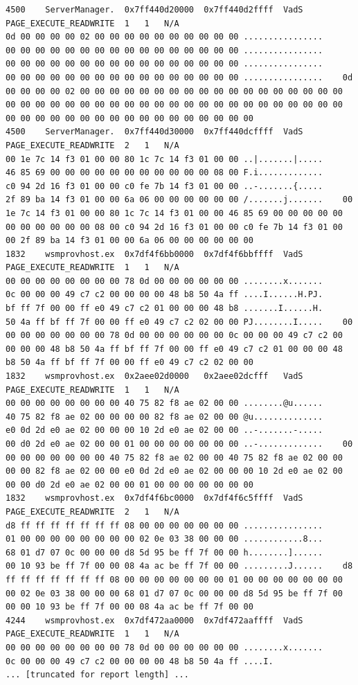 \documentclass[11pt,letterpaper]{article}
\begin{document}
\begin{lstlisting}
4500	ServerManager.	0x7ff440d20000	0x7ff440d2ffff	VadS	PAGE_EXECUTE_READWRITE	1	1	N/A	
0d 00 00 00 00 02 00 00 00 00 00 00 00 00 00 00 ................
00 00 00 00 00 00 00 00 00 00 00 00 00 00 00 00 ................
00 00 00 00 00 00 00 00 00 00 00 00 00 00 00 00 ................
00 00 00 00 00 00 00 00 00 00 00 00 00 00 00 00 ................	0d 00 00 00 00 02 00 00 00 00 00 00 00 00 00 00 00 00 00 00 00 00 00 00 00 00 00 00 00 00 00 00 00 00 00 00 00 00 00 00 00 00 00 00 00 00 00 00 00 00 00 00 00 00 00 00 00 00 00 00 00 00 00 00
4500	ServerManager.	0x7ff440d30000	0x7ff440dcffff	VadS	PAGE_EXECUTE_READWRITE	2	1	N/A	
00 1e 7c 14 f3 01 00 00 80 1c 7c 14 f3 01 00 00 ..|.......|.....
46 85 69 00 00 00 00 00 00 00 00 00 00 00 08 00 F.i.............
c0 94 2d 16 f3 01 00 00 c0 fe 7b 14 f3 01 00 00 ..-.......{.....
2f 89 ba 14 f3 01 00 00 6a 06 00 00 00 00 00 00 /.......j.......	00 1e 7c 14 f3 01 00 00 80 1c 7c 14 f3 01 00 00 46 85 69 00 00 00 00 00 00 00 00 00 00 00 08 00 c0 94 2d 16 f3 01 00 00 c0 fe 7b 14 f3 01 00 00 2f 89 ba 14 f3 01 00 00 6a 06 00 00 00 00 00 00
1832	wsmprovhost.ex	0x7df4f6bb0000	0x7df4f6bbffff	VadS	PAGE_EXECUTE_READWRITE	1	1	N/A	
00 00 00 00 00 00 00 00 78 0d 00 00 00 00 00 00 ........x.......
0c 00 00 00 49 c7 c2 00 00 00 00 48 b8 50 4a ff ....I......H.PJ.
bf ff 7f 00 00 ff e0 49 c7 c2 01 00 00 00 48 b8 .......I......H.
50 4a ff bf ff 7f 00 00 ff e0 49 c7 c2 02 00 00 PJ........I.....	00 00 00 00 00 00 00 00 78 0d 00 00 00 00 00 00 0c 00 00 00 49 c7 c2 00 00 00 00 48 b8 50 4a ff bf ff 7f 00 00 ff e0 49 c7 c2 01 00 00 00 48 b8 50 4a ff bf ff 7f 00 00 ff e0 49 c7 c2 02 00 00
1832	wsmprovhost.ex	0x2aee02d0000	0x2aee02dcfff	VadS	PAGE_EXECUTE_READWRITE	1	1	N/A	
00 00 00 00 00 00 00 00 40 75 82 f8 ae 02 00 00 ........@u......
40 75 82 f8 ae 02 00 00 00 00 82 f8 ae 02 00 00 @u..............
e0 0d 2d e0 ae 02 00 00 00 10 2d e0 ae 02 00 00 ..-.......-.....
00 d0 2d e0 ae 02 00 00 01 00 00 00 00 00 00 00 ..-.............	00 00 00 00 00 00 00 00 40 75 82 f8 ae 02 00 00 40 75 82 f8 ae 02 00 00 00 00 82 f8 ae 02 00 00 e0 0d 2d e0 ae 02 00 00 00 10 2d e0 ae 02 00 00 00 d0 2d e0 ae 02 00 00 01 00 00 00 00 00 00 00
1832	wsmprovhost.ex	0x7df4f6bc0000	0x7df4f6c5ffff	VadS	PAGE_EXECUTE_READWRITE	2	1	N/A	
d8 ff ff ff ff ff ff ff 08 00 00 00 00 00 00 00 ................
01 00 00 00 00 00 00 00 00 02 0e 03 38 00 00 00 ............8...
68 01 d7 07 0c 00 00 00 d8 5d 95 be ff 7f 00 00 h........]......
00 10 93 be ff 7f 00 00 08 4a ac be ff 7f 00 00 .........J......	d8 ff ff ff ff ff ff ff 08 00 00 00 00 00 00 00 01 00 00 00 00 00 00 00 00 02 0e 03 38 00 00 00 68 01 d7 07 0c 00 00 00 d8 5d 95 be ff 7f 00 00 00 10 93 be ff 7f 00 00 08 4a ac be ff 7f 00 00
4244	wsmprovhost.ex	0x7df472aa0000	0x7df472aaffff	VadS	PAGE_EXECUTE_READWRITE	1	1	N/A	
00 00 00 00 00 00 00 00 78 0d 00 00 00 00 00 00 ........x.......
0c 00 00 00 49 c7 c2 00 00 00 00 48 b8 50 4a ff ....I.
... [truncated for report length] ...

\end{lstlisting}
\end{document}
